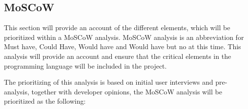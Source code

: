 \subsection{MoSCoW}


This section will provide an account of the different elements, which will be prioritized within a MoSCoW analysis. MoSCoW analysis is an abbreviation for Must have, Could Have, Would have and Would have but no at this time. This analysis will provide an account and ensure that the critical elements in the programming language will be included in the project.

The prioritizing of this analysis is based on initial user interviews and pre-analysis, together with developer opinions, the MoSCoW analysis will be prioritized as the following:\\


